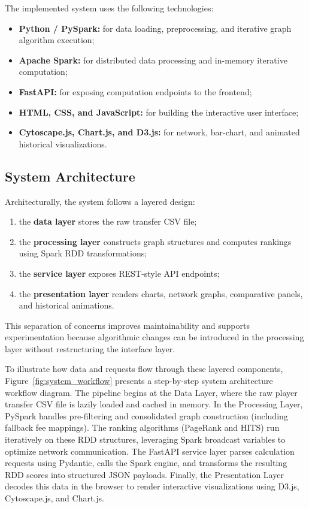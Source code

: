 The implemented system uses the following technologies:
\begin{itemize}
    \item \textbf{Python / PySpark:} for data loading, preprocessing, and iterative graph algorithm execution;
    \item \textbf{Apache Spark:} for distributed data processing and in-memory iterative computation;
    \item \textbf{FastAPI:} for exposing computation endpoints to the frontend;
    \item \textbf{HTML, CSS, and JavaScript:} for building the interactive user interface;
    \item \textbf{Cytoscape.js, Chart.js, and D3.js:} for network, bar-chart, and animated historical visualizations.
\end{itemize}

\subsection{System Architecture}
\label{subsec:system_architecture}

Architecturally, the system follows a layered design:
\begin{enumerate}
    \item the \textbf{data layer} stores the raw transfer CSV file;
    \item the \textbf{processing layer} constructs graph structures and computes rankings using Spark RDD transformations;
    \item the \textbf{service layer} exposes REST-style API endpoints;
    \item the \textbf{presentation layer} renders charts, network graphs, comparative panels, and historical animations.
\end{enumerate}

This separation of concerns improves maintainability and supports experimentation because algorithmic changes can be introduced in the processing layer without restructuring the interface layer.

To illustrate how data and requests flow through these layered components, Figure~\ref{fig:system_workflow} presents a step-by-step system architecture workflow diagram. The pipeline begins at the Data Layer, where the raw player transfer CSV file is lazily loaded and cached in memory. In the Processing Layer, PySpark handles pre-filtering and consolidated graph construction (including fallback fee mappings). The ranking algorithms (PageRank and HITS) run iteratively on these RDD structures, leveraging Spark broadcast variables to optimize network communication. The FastAPI service layer parses calculation requests using Pydantic, calls the Spark engine, and transforms the resulting RDD scores into structured JSON payloads. Finally, the Presentation Layer decodes this data in the browser to render interactive visualizations using D3.js, Cytoscape.js, and Chart.js.

